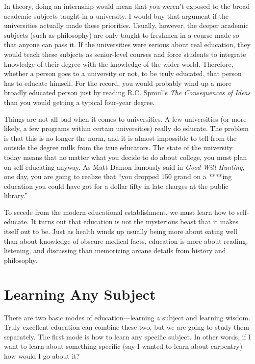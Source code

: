 In theory, doing an internship would mean that you weren’t exposed to
the broad academic subjects taught in a university. I would buy that
argument if the universities actually made these priorities. Usually,
however, the deeper academic subjects (such as philosophy) are only
taught to freshmen in a course made so that anyone can pass it. If the
universities were serious about real education, they would teach these
subjects as senior-level courses and force
students to integrate
knowledge of their
degree with the knowledge of the wider world. Therefore, whether
a person goes to a
university or not, to be truly educated,
that person
has to educate
himself.
For the record, you
would probably wind up a more broadly educated person just by reading
R.C. Sproul’s \textit{The Consequences of Ideas} than you would getting
a typical four-year degree. 

Things are not all bad when it comes to universities. A few universities
(or more likely, a few programs within certain universities) really do
educate. The problem is that this is no longer the norm, and it is
almost impossible to tell from the outside the degree mills from the
true educators. The state of the university today means that no matter
what you decide to do about college, you must plan on self-educating
anyway. As Matt Damon famously said in \textit{Good Will Hunting}, one
day, you are going to realize that “you dropped 150 grand on a ****ing
education you could have got for a dollar fifty in late charges at the
public library.”

To secede from the modern educational establishment, we must learn how
to self-educate. It turns out that education is not the mysterious
beast that it makes itself out to be. Just as health winds up usually
being more about eating well than about knowledge of obscure medical
facts, education is more about reading, listening, and discussing than
memorizing arcane details from history and philosophy.

\section{Learning Any Subject}

There are two basic modes of education—learning a subject and learning
wisdom. Truly excellent education can combine these two, but we are
going to study them separately. The first mode is how to learn any
specific subject. In other words, if I want to learn about something
specific (say I
wanted to learn about
carpentry) how would
I go about it?  

